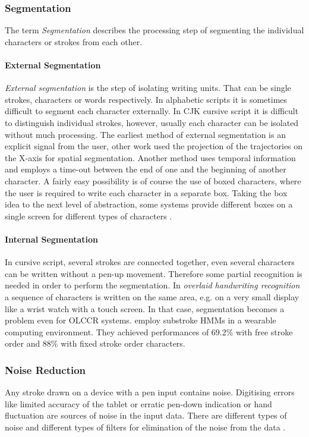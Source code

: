 \subsubsection{Segmentation}
\label{sec:segmentation}

The term \emph{Segmentation} describes the processing step of segmenting the 
individual characters or strokes from each other.

\paragraph{External Segmentation}
\label{sec:externasegmentation}
\emph{External segmentation} is the step of isolating writing units. That can be
single strokes, characters or words respectively. In alphabetic scripts it is 
sometimes difficult to segment each character externally. In CJK cursive script 
it is difficult to distinguish individual strokes, however, usually each 
character can be isolated without much processing.  
The earliest method of external segmentation is an explicit signal from the user,
other work used the projection of the trajectories on the X-axis for spatial
segmentation. Another method uses temporal information and employs a time-out
between the end of one and the beginning of another character.
A fairly easy possibility is of course the use of boxed characters, where the 
user is required to write each character in a separate box.
Taking the box idea to the next level of abstraction, some systems provide 
different boxes on a single screen for different types of characters 
.

\paragraph{Internal Segmentation}
\label{sec:internalsegmentation}
In cursive script, several strokes are connected together, even several 
characters can be written without a pen-up movement. Therefore some partial 
recognition is needed in order to perform the segmentation.
In \emph{overlaid handwriting recognition} a sequence of characters is written 
on the same area, e.g. on a very small display like a wrist watch with a touch 
screen. In that case, segmentation becomes a problem even for OLCCR systems.
 employ substroke HMMs in a wearable computing 
environment. They achieved performances of 69.2\% with free stroke order
and 88\% with fixed stroke order characters.

\subsubsection{Noise Reduction} 
\label{sec:noisereduction}
Any stroke drawn on a device with a pen input contains noise. Digitising errors
like limited accuracy of the tablet or erratic pen-down indication or hand 
fluctuation are sources of noise in the input data.  There are different types 
of noise and different types of filters for elimination of the noise from the 
data .

